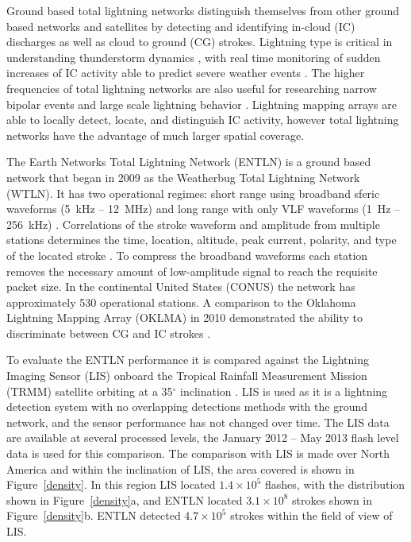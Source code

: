 Ground based total lightning networks distinguish themselves from other ground based networks and satellites by detecting and identifying in-cloud (IC) discharges as well as cloud to ground (CG) strokes.
Lightning type is critical in understanding thunderstorm dynamics \citep{Williams1989}, with real time monitoring of sudden increases of IC activity able to predict severe weather events \citep{Rudlosky2013, Darden2010, Metzger2013, Schultz2009, Schultz2011}.
The higher frequencies of total lightning networks are also useful for researching narrow bipolar events \citep{Suszcynsky2003} and large scale lightning behavior \citep{Hutchins2013}.
Lightning mapping arrays are able to locally detect, locate, and distinguish IC activity, however total lightning networks have the advantage of much larger spatial coverage.

The Earth Networks Total Lightning Network (ENTLN) is a ground based network that began in 2009 as the Weatherbug Total Lightning Network (WTLN).
It has two operational regimes: short range using broadband sferic waveforms (5~kHz -- 12~MHz) and long range with only VLF waveforms (1~Hz -- 256~kHz) \citep{Heckman2010}.
Correlations of the stroke waveform and amplitude from multiple stations determines the time, location, altitude, peak current, polarity, and type of the located stroke \citep{Liu2011a}.
To compress the broadband waveforms each station removes the necessary amount of low-amplitude signal to reach the requisite packet size.
In the continental United States (CONUS) the network has approximately 530 operational stations.
A comparison to the Oklahoma Lightning Mapping Array (OKLMA) in 2010 demonstrated the ability to discriminate between CG and IC strokes \citep{Beasley2010}.

To evaluate the ENTLN performance it is compared against the Lightning Imaging Sensor (LIS) onboard the Tropical Rainfall Measurement Mission (TRMM) satellite orbiting at a 35$^\circ$ inclination \citep{Christian1999}.
LIS is used as it is a lightning detection system with no overlapping detections methods with the ground network, and the sensor performance has not changed over time.
The LIS data are available at several processed levels, the January 2012 -- May 2013 flash level data is used for this comparison.
The comparison with LIS is made over North America and within the inclination of LIS, the area covered is shown in Figure~\ref{density}.
In this region LIS located $1.4\times10^5$ flashes, with the distribution shown in Figure~\ref{density}a, and ENTLN located $3.1\times10^8$ strokes shown in Figure~\ref{density}b.
ENTLN detected $4.7\times10^5$ strokes within the field of view of LIS.

